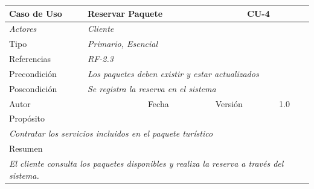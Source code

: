 \begin{table}[H]
\begin{tabular}{|llllllll|}
\hline
\multicolumn{1}{|l|}{\cellcolor[HTML]{F2F2F2}Caso de Uso} & \multicolumn{5}{l|}{Reservar Paquete} & \multicolumn{2}{l|}{\cellcolor[HTML]{E6E6E6}CU-4} \\ \hline
\multicolumn{1}{|l|}{{\color[HTML]{808080} \textit{Actores}}} & \multicolumn{7}{l|}{{\color[HTML]{808080} \textit{Cliente}}} \\ \hline
\multicolumn{1}{|l|}{Tipo} & \multicolumn{7}{l|}{{\color[HTML]{808080} \textit{Primario, Esencial}}} \\ \hline
\multicolumn{1}{|l|}{Referencias} & \multicolumn{2}{l|}{{\color[HTML]{808080} \textit{RF-2.3}}} & \multicolumn{5}{l|}{} \\ \hline
\multicolumn{1}{|l|}{Precondición} & \multicolumn{7}{l|}{{\color[HTML]{808080} \textit{Los paquetes deben existir y estar actualizados}}} \\ \hline
\multicolumn{1}{|l|}{Poscondición} & \multicolumn{7}{l|}{{\color[HTML]{808080} \textit{Se registra la reserva en el sistema}}} \\ \hline
\multicolumn{1}{|l|}{Autor} & \multicolumn{1}{l|}{} & \multicolumn{2}{l|}{Fecha} & \multicolumn{1}{l|}{} & \multicolumn{2}{l|}{Versión} & 1.0 \\ \hline
\multicolumn{8}{|l|}{Propósito} \\ \hline
\multicolumn{8}{|p{15cm}|}{{\color[HTML]{808080} \textit{Contratar los servicios incluidos en el paquete turístico}}} \\ \hline
\multicolumn{8}{|l|}{Resumen} \\ \hline
\multicolumn{8}{|p{15cm}|}{{\color[HTML]{808080} \textit{El cliente consulta los paquetes disponibles y realiza la reserva a través del sistema.}}} \\ \hline
\end{tabular}
\end{table}

